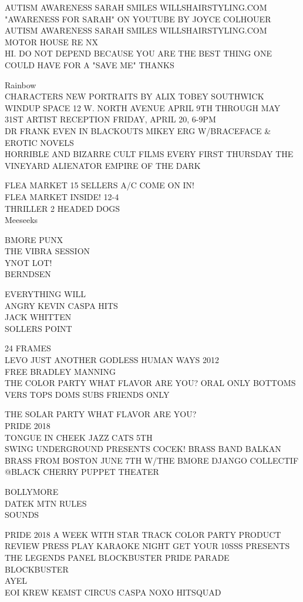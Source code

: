 \documentclass[10pt,letterpaper]{article}
\begin{document}
AUTISM AWARENESS SARAH SMILES WILLSHAIRSTYLING.COM "AWARENESS FOR SARAH" ON YOUTUBE BY JOYCE COLHOUER\\
AUTISM AWARENESS SARAH SMILES WILLSHAIRSTYLING.COM\\
MOTOR HOUSE RE NX\\
HI.  DO NOT DEPEND BECAUSE YOU ARE THE BEST THING ONE COULD HAVE FOR A "SAVE ME" THANKS

Rainbow\\
CHARACTERS NEW PORTRAITS BY ALIX TOBEY SOUTHWICK WINDUP SPACE 12 W. NORTH AVENUE APRIL 9TH THROUGH MAY 31ST ARTIST RECEPTION FRIDAY, APRIL 20, 6{-}9PM\\
DR FRANK EVEN IN BLACKOUTS MIKEY ERG W/BRACEFACE \& EROTIC NOVELS\\
HORRIBLE AND BIZARRE CULT FILMS EVERY FIRST THURSDAY THE VINEYARD ALIENATOR EMPIRE OF THE DARK

FLEA MARKET 15 SELLERS A/C COME ON IN!\\
FLEA MARKET INSIDE! 12{-}4\\
THRILLER 2 HEADED DOGS\\
Meeseeks

BMORE PUNX\\
THE VIBRA SESSION\\
YNOT LOT!\\
BERNDSEN

EVERYTHING WILL\\
ANGRY KEVIN CASPA HITS\\
JACK WHITTEN\\
SOLLERS POINT

24 FRAMES\\
LEVO JUST ANOTHER GODLESS HUMAN WAYS 2012\\
FREE BRADLEY MANNING\\
THE COLOR PARTY WHAT FLAVOR ARE YOU?  ORAL ONLY BOTTOMS VERS TOPS DOMS SUBS FRIENDS ONLY

THE SOLAR PARTY WHAT FLAVOR ARE YOU?\\
PRIDE 2018\\
TONGUE IN CHEEK JAZZ CATS 5TH\\
SWING UNDERGROUND PRESENTS COCEK!  BRASS BAND BALKAN BRASS FROM BOSTON JUNE 7TH W/THE BMORE DJANGO COLLECTIF @BLACK CHERRY PUPPET THEATER

BOLLYMORE\\
DATEK MTN RULES\\
SOUNDS

PRIDE 2018 A WEEK WITH STAR TRACK COLOR PARTY PRODUCT REVIEW PRESS PLAY KARAOKE NIGHT GET YOUR 10SSS PRESENTS THE LEGENDS PANEL BLOCKBUSTER PRIDE PARADE\\
BLOCKBUSTER\\
AYEL\\
EOI KREW KEMST CIRCUS CASPA NOXO HITSQUAD
\end{document}

